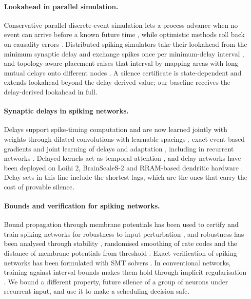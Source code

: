\documentclass{iopjournal}
\begin{document}
\paragraph{Lookahead in parallel simulation.} Conservative parallel discrete-event simulation lets a process advance when no event can arrive before a known future time \cite{chandymisra,fujimoto}, while optimistic methods roll back on causality errors \cite{jefferson}. Distributed spiking simulators take their lookahead from the minimum synaptic delay and exchange spikes once per minimum-delay interval \cite{nest,pronold2022}, and topology-aware placement raises that interval by mapping areas with long mutual delays onto different nodes \cite{lober,stacs}. A silence certificate is state-dependent and extends lookahead beyond the delay-derived value; our baseline receives the delay-derived lookahead in full.

\paragraph{Synaptic delays in spiking networks.} Delays support spike-timing computation \cite{polychron} and are now learned jointly with weights through dilated convolutions with learnable spacings \cite{dcls}, exact event-based gradients \cite{meszaros2025,delgrad,nowotny2025} and joint learning of delays and adaptation \cite{deckers2024}, including in recurrent networks \cite{delrec,balafrej2025}. Delayed kernels act as temporal attention \cite{bamsldk}, and delay networks have been deployed on Loihi 2, BrainScaleS-2 and RRAM-based dendritic hardware \cite{loihidelays,delgrad,denram}. Delay sets in this line include the shortest lags, which are the ones that carry the cost of provable silence.

\paragraph{Bounds and verification for spiking networks.} Bound propagation through membrane potentials has been used to certify and train spiking networks for robustness to input perturbation \cite{certsnn}, and robustness has been analysed through stability \cite{rsnn2024}, randomised smoothing of rate codes \cite{mukhoty2024} and the distance of membrane potentials from threshold \cite{wang2026}. Exact verification of spiking networks has been formulated with SMT solvers \cite{banerjee2023}. In conventional networks, training against interval bounds makes them hold through implicit regularisation \cite{gowal2019,mao2024}. We bound a different property, future silence of a group of neurons under recurrent input, and use it to make a scheduling decision safe.
\end{document}
